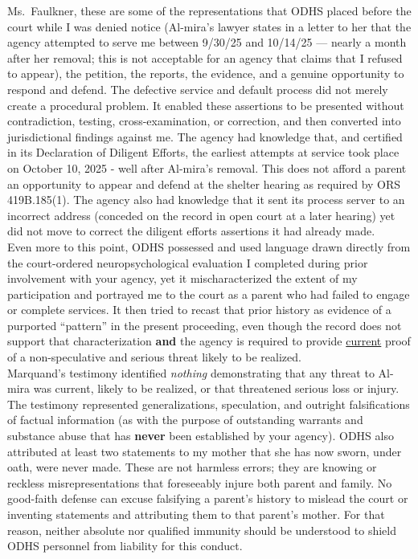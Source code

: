 \documentclass[10pt,a4paper,roman]{moderncv}
\begin{document}
	\noindent Ms.~Faulkner, these are some of the representations that ODHS placed before the court while I was denied notice (Al-mira's lawyer states in a letter to her that the agency attempted to serve me between 9/30/25 and 10/14/25 --- nearly a month after her removal; this is not acceptable for an agency that claims that I refused to appear), the petition, the reports, the evidence, and a genuine opportunity to respond and defend. The defective service and default process did not merely create a procedural problem. It enabled these assertions to be presented without contradiction, testing, cross-examination, or correction, and then converted into jurisdictional findings against me. The agency had knowledge that, and certified in its Declaration of Diligent Efforts, the earliest attempts at service took place on October 10, 2025 - well after Al-mira's removal. This does not afford a parent an opportunity to appear and defend at the shelter hearing as required by ORS 419B.185(1). The agency also had knowledge that it sent its process server to an incorrect address (conceded on the record in open court at a later hearing) yet did not move to correct the diligent efforts assertions it had already made. \\
	
	Even more to this point, ODHS possessed and used language drawn directly from the court-ordered neuropsychological evaluation I completed during prior involvement with your agency, yet it mischaracterized the extent of my participation and portrayed me to the court as a parent who had failed to engage or complete services. It then tried to recast that prior history as evidence of a purported ``pattern'' in the present proceeding, even though the record does not support that characterization \textbf{and} the agency is required to provide \underline{current} proof of a non-speculative and serious threat likely to be realized.\\
	
	Marquand's testimony identified \textit{nothing} demonstrating that any threat to Al-mira was current, likely to be realized, or that threatened serious loss or injury. The testimony represented generalizations, speculation, and outright falsifications of factual information (as with the purpose of outstanding warrants and substance abuse that has \textbf{never} been established by your agency). ODHS also attributed at least two statements to my mother that she has now sworn, under oath, were never made. These are not harmless errors; they are knowing or reckless misrepresentations that foreseeably injure both parent and family. No good-faith defense can excuse falsifying a parent's history to mislead the court or inventing statements and attributing them to that parent's mother. For that reason, neither absolute nor qualified immunity should be understood to shield ODHS personnel from liability for this conduct.\\
	
\end{document}
